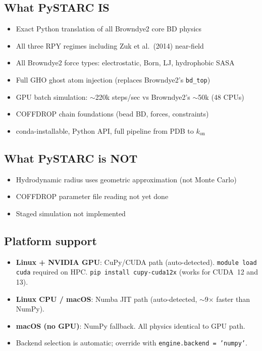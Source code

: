 \documentclass[12pt,a4paper]{article}
\begin{document}
\subsection*{What PySTARC IS}
\begin{itemize}[nosep]
\item Exact Python translation of all Browndye2 core BD physics
\item All three RPY regimes including Zuk et al.\ (2014) near-field
\item All Browndye2 force types: electrostatic, Born, LJ, hydrophobic SASA
\item Full GHO ghost atom injection (replaces Browndye2's \texttt{bd\_top})
\item GPU batch simulation: $\sim$220k steps/sec vs Browndye2's $\sim$50k (48 CPUs)
\item COFFDROP chain foundations (bead BD, forces, constraints)
\item conda-installable, Python API, full pipeline from PDB to $k_\mathrm{on}$
\end{itemize}

\subsection*{What PySTARC is NOT}
\begin{itemize}[nosep]
\item Hydrodynamic radius uses geometric approximation (not Monte Carlo)
\item COFFDROP parameter file reading not yet done
\item Staged simulation not implemented
\end{itemize}

\subsection*{Platform support}
\begin{itemize}[nosep]
\item \textbf{Linux + NVIDIA GPU}: CuPy/CUDA path (auto-detected).
  \texttt{module load cuda} required on HPC.
  \texttt{pip install cupy-cuda12x} (works for CUDA~12 and 13).
\item \textbf{Linux CPU / macOS}: Numba JIT path (auto-detected, $\sim$9$\times$ faster than NumPy).
\item \textbf{macOS (no GPU)}: NumPy fallback. All physics identical to GPU path.
\item Backend selection is automatic; override with \texttt{engine.backend = 'numpy'}.
\end{itemize}
\end{document}
